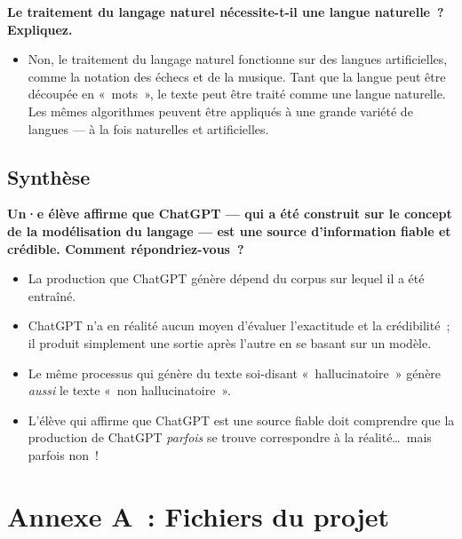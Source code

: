 \documentclass[12pt,a4paper]{article}
\begin{document}
\begin{thinkbox}
  \textbf{Le traitement du langage naturel nécessite-t-il une langue naturelle~? Expliquez.}
  \begin{itemize}
    \item Non, le traitement du langage naturel fonctionne sur des langues artificielles, comme la notation des échecs et de la musique. Tant que la langue peut être découpée en «~mots~», le texte peut être traité comme une langue naturelle. Les mêmes algorithmes peuvent être appliqués à une grande variété de langues — à la fois naturelles et artificielles.
  \end{itemize}
\end{thinkbox}

\subsection{Synthèse}

\begin{thinkbox}
  \textbf{Un·e élève affirme que ChatGPT — qui a été construit sur le concept de la modélisation du langage — est une source d'information fiable et crédible. Comment répondriez-vous~?}
  \begin{itemize}
    \item La production que ChatGPT génère dépend du corpus sur lequel il a été entraîné.
    \item ChatGPT n'a en réalité aucun moyen d'évaluer l'exactitude et la crédibilité~; il produit simplement une sortie après l'autre en se basant sur un modèle.
    \item Le même processus qui génère du texte soi-disant «~hallucinatoire~» génère \emph{aussi} le texte «~non hallucinatoire~».
    \item L'élève qui affirme que ChatGPT est une source fiable doit comprendre que la production de ChatGPT \emph{parfois} se trouve correspondre à la réalité…~mais parfois non~!
  \end{itemize}
\end{thinkbox}

\newpage

\section*{Annexe A~: Fichiers du projet}
\end{document}
